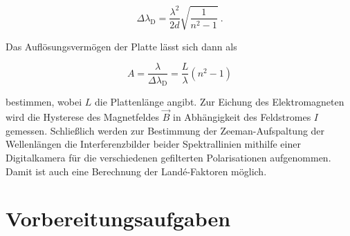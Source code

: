 \vspace{-15pt}
\begin{equation}
    \Delta \lambda_\text{D} = \frac{\lambda^2}{2d} \sqrt{\frac{1}{n^2-1}}\: .
\end{equation}

Das Auflösungsvermögen der Platte lässt sich dann als

\begin{equation}
    A = \frac{\lambda}{\Delta \lambda_\text{D}} = \frac{L}{\lambda} (n^2 -1)
\end{equation}

bestimmen, wobei $L$ die Plattenlänge angibt.
Zur Eichung des Elektromagneten wird die Hysterese des Magnetfeldes $\vec{B}$ in Abhängigkeit
des Feldstromes $I$ gemessen. Schließlich werden zur Bestimmung der Zeeman-Aufspaltung der
Wellenlängen die Interferenzbilder beider Spektrallinien mithilfe einer Digitalkamera
für die verschiedenen gefilterten Polarisationen aufgenommen. Damit ist auch 
eine Berechnung der Landé-Faktoren möglich.

\section{Vorbereitungsaufgaben}

